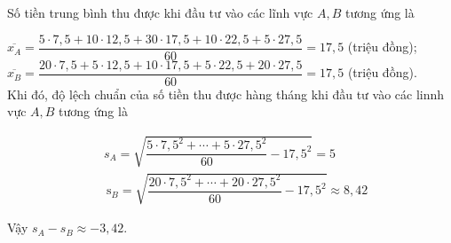\begin{ex}
{		Số tiền trung bình thu được khi đầu tư vào các lĩnh vực $A, B$ tương ứng là
		
		$\overline{x_A}=\dfrac{5\cdot 7{,}5+10\cdot 12{,}5+30\cdot 17{,}5+10\cdot 22{,}5+5\cdot 27{,}5}{60}=17{,}5$ (triệu đồng);\\
		
		$\overline{x_B}=\dfrac{20\cdot 7{,}5+5\cdot 12{,}5+10\cdot 17{,}5+5\cdot 22{,}5+20\cdot 27{,}5}{60}=17{,}5$ (triệu đồng).\\
		
		Khi đó, độ lệch chuẩn của số tiền thu được hàng tháng khi đầu tư vào các linnh vực $A, B$ tương ứng là
		
		$$
		\begin{aligned}
		& s_A=\sqrt{\dfrac{5\cdot 7{,}5^2+\cdots+5\cdot 27{,}5^2}{60}-17{,}5^2}=5 \\
		& \mathrm{~s}_B=\sqrt{\dfrac{20\cdot 7{,}5^2+\cdots+20\cdot 27{,}5^2}{60}-17{,}5^2} \approx 8{,}42
		\end{aligned}
		$$
		
		Vậy $s_A-s_B \approx-3{,}42$.
	}
\end{ex}

